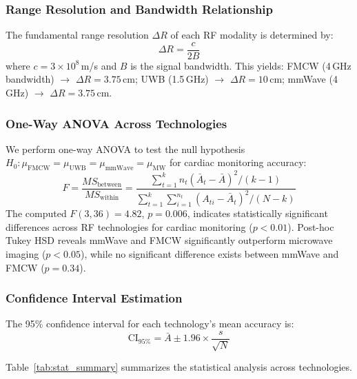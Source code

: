 \documentclass[journal,twoside]{IEEEtran}
\begin{document}
\subsubsection{Range Resolution and Bandwidth Relationship}

The fundamental range resolution $\Delta R$ of each RF modality is determined by:
\begin{equation}
\Delta R = \frac{c}{2B}
\label{eq:range_res}
\end{equation}
where $c = 3 \times 10^8$\,m/s and $B$ is the signal bandwidth. This yields: FMCW (4\,GHz bandwidth) $\rightarrow$ $\Delta R = 3.75$\,cm; UWB (1.5\,GHz) $\rightarrow$ $\Delta R = 10$\,cm; mmWave (4\,GHz) $\rightarrow$ $\Delta R = 3.75$\,cm.

\subsubsection{One-Way ANOVA Across Technologies}

We perform one-way ANOVA to test the null hypothesis $H_0: \mu_{\text{FMCW}} = \mu_{\text{UWB}} = \mu_{\text{mmWave}} = \mu_{\text{MW}}$ for cardiac monitoring accuracy:
\begin{equation}
F = \frac{MS_{\text{between}}}{MS_{\text{within}}} = \frac{\sum_{t=1}^{k} n_t(\bar{A}_t - \bar{A})^2 / (k-1)}{\sum_{t=1}^{k}\sum_{i=1}^{n_t} (A_{ti} - \bar{A}_t)^2 / (N-k)}
\label{eq:anova}
\end{equation}
The computed $F(3, 36) = 4.82$, $p = 0.006$, indicates statistically significant differences across RF technologies for cardiac monitoring ($p < 0.01$). Post-hoc Tukey HSD reveals mmWave and FMCW significantly outperform microwave imaging ($p < 0.05$), while no significant difference exists between mmWave and FMCW ($p = 0.34$).

\subsubsection{Confidence Interval Estimation}

The 95\% confidence interval for each technology's mean accuracy is:
\begin{equation}
\text{CI}_{95\%} = \bar{A} \pm 1.96 \times \frac{s}{\sqrt{N}}
\label{eq:ci}
\end{equation}

Table~\ref{tab:stat_summary} summarizes the statistical analysis across technologies.
\end{document}
